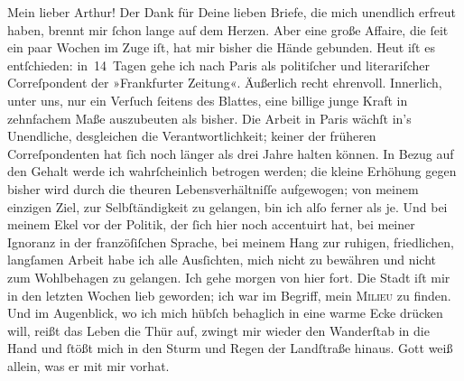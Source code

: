 \pstart\center{}Mein lieber Arthur!\pend\vspace{0.5em}
\pstart
           Der Dank für Deine lieben Briefe, die mich unendlich erfreut haben, brennt mir ſchon
               lange auf dem Herzen. Aber eine große Affaire, die ſeit ein paar Wochen im Zuge iſt,
               hat mir bisher die Hände gebunden. Heut iſt es entſchieden: in 14 Tagen gehe ich nach
                  Paris als politiſcher und literariſcher
               Correſpondent der »Frankfurter Zeitung«.
               Äußerlich recht ehrenvoll. Innerlich, unter uns, nur ein Verſuch ſeitens des Blattes, eine billige junge
               Kraft in zehnfachem Maße auszubeuten als bisher. Die Arbeit in Paris wächſt in’s Unendliche, desgleichen die
               Verantwortlichkeit; keiner der früheren Correſpondenten {\pb}hat ſich noch länger als drei Jahre halten können.
               In Bezug auf den Gehalt werde ich wahrſcheinlich betrogen werden; die kleine Erhöhung
               gegen bisher wird durch die theuren Lebensverhältniſſe aufgewogen; von meinem
               einzigen Ziel, zur Selbſtändigkeit zu  gelangen, bin ich alſo ferner als je. Und bei meinem Ekel vor der Politik, der
               ſich hier noch  accentuirt hat, bei meiner Ignoranz
               in der franzöſiſchen Sprache, bei meinem Hang zur ruhigen, \strikeout{\textcolor{gray}{ſt}} friedlichen, langſamen Arbeit habe ich alle Ausſichten, mich nicht zu bewähren
               und nicht zum Wohlbehagen zu gelangen. Ich gehe morgen
               von hier fort. Die Stadt iſt
               mir in den letzten Wochen lieb geworden; ich war im Begriff, mein \textsc{Milieu} zu finden. Und im Augenblick, wo ich mich hübſch
               behaglich in eine warme Ecke drücken will, {\pb} reißt das Leben die Thür auf, zwingt mir wieder
               den Wanderſtab  in die Hand und ſtößt mich in
               den Sturm und Regen der Landſtraße hinaus. Gott weiß allein, was er mit mir
               vorhat.\pend
           
